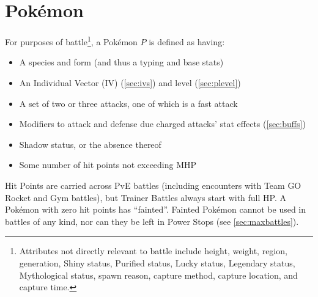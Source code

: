 \chapter{Pokémon}
\label{chap:pokemon}
For purposes of battle\footnote{Attributes not directly relevant to battle include height, weight, region,
generation, Shiny status, Purified status, Lucky status, Legendary status, Mythological status, spawn
reason, capture method, capture location, and capture time.}, a Pokémon $P$ is defined as having:
\begin{itemize}
\item A species and form (and thus a typing and base stats)
\item An Individual Vector (IV) (\autoref{sec:ivs}) and level (\autoref{sec:plevel})
\item A set of two or three attacks, one of which is a fast attack
\item Modifiers to attack and defense due charged attacks' stat effects (\autoref{sec:buffs})
\item Shadow status, or the absence thereof
\item Some number of hit points not exceeding MHP
\end{itemize}
Hit Points are carried across PvE battles (including encounters with
  Team GO Rocket and Gym battles), but Trainer Battles always start with full HP\@.
A Pokémon with zero hit points has ``fainted''.
Fainted Pokémon cannot be used in battles of any kind, nor can they be left in
 Power Stops (see \autoref{sec:maxbattles}).

